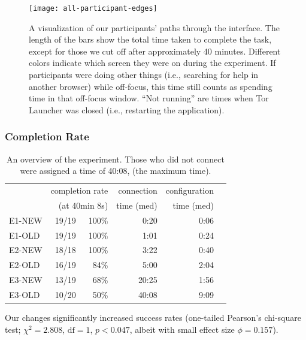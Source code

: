 \documentclass[USenglish,oneside,twocolumn]{article}
\begin{document}
\label{all-participant-edges} 
\begin{figure}
\centering
\texttt{[image: all-participant-edges]}
\caption{
A visualization of our participants' paths through the interface.
The length of the bars show the total time taken to complete the task,
except for those we cut off after approximately 40 minutes.
Different colors indicate which screen they were on during the experiment.
If participants were doing other things (i.e., searching for help in another browser)
while off-focus, this time still counts as spending time in that off-focus window. 
``Not running'' are times when Tor Launcher was closed (i.e., restarting the application).}
\label{fig:all-participant-edges}
\end{figure}

\subsubsection{Completion Rate} 

\begin{table}[t]
\centering
\begin{tabular}{l r r r r r}
& \multicolumn{2}{r}{completion rate} & \multicolumn{1}{r}{connection} & \multicolumn{1}{r}{configuration} \\
& \multicolumn{2}{r}{(at 40min 8s)} & \multicolumn{1}{r}{time (med)} & \multicolumn{1}{r}{time (med)} \\
\noalign{\hrule}
E1-NEW & 19/19 & 100\% & 0:20 & 0:06 \\
E1-OLD & 19/19 & 100\% & 1:01 & 0:24 \\
E2-NEW & 18/18 & 100\% & 3:22 & 0:40 \\
E2-OLD & 16/19 & 84\% & 5:00 & 2:04 \\
E3-NEW & 13/19 & 68\% & 20:25 & 1:56 \\
E3-OLD & 10/20 & 50\% & 40:08 & 9:09 \\
\end{tabular}
\caption{
An overview of the experiment. 
Those who did not connect were assigned a time of 40:08, 
(the maximum time).
}
\label{table:participant-summary}
\end{table}

Our changes significantly increased success rates (one-tailed Pearson's chi-square test; $\chi^2 = 2.808$, $\mbox{df} = 1$, $p < 0.047$, albeit with small effect size $\phi=0.157$).
\end{document}
